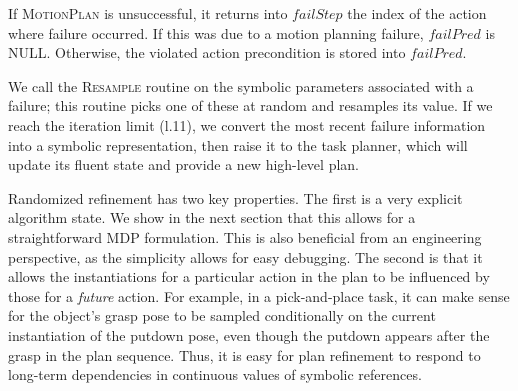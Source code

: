 If \textsc{MotionPlan} is unsuccessful, it returns into $failStep$ the index of the action where failure occurred.
If this was due to a motion planning failure, $failPred$ is NULL. Otherwise,
the violated action precondition is stored into $failPred$.

We call the \textsc{Resample} routine on the symbolic parameters
associated with a failure; this routine picks one of these at random and
resamples its value. If we reach the iteration limit (l.11),
we convert the most recent failure information into a symbolic representation, then raise it
to the task planner, which will update its fluent state and provide a new
high-level plan.

Randomized refinement has two key properties. The first is a very explicit algorithm state.
We show in the next section that this allows for a straightforward MDP
formulation. This is also beneficial from an
engineering perspective, as the simplicity allows for easy debugging. The second is that
it allows the instantiations for a particular action in
the plan to be influenced by those for a \emph{future} action. For example, in a
pick-and-place task, it can make sense for the object's grasp pose to be sampled
conditionally on the current instantiation of the putdown pose, even though the putdown
appears after the grasp in the plan sequence. Thus, it is easy for plan refinement to
respond to long-term dependencies in continuous values of symbolic references.